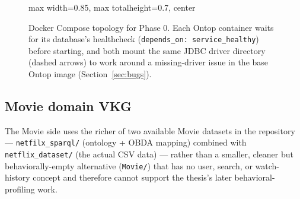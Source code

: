 \documentclass[11pt,a4paper]{article}
\newcommand{\code}[1]{\texttt{#1}}
\begin{document}
\begin{figure}[H]
\centering
\begin{adjustbox}{max width=0.85\textwidth, max totalheight=0.7\textheight, center}
\end{adjustbox}
\caption{Docker Compose topology for Phase 0. Each Ontop container waits for its database's
healthcheck (\code{depends\_on: service\_healthy}) before starting, and both mount the same JDBC
driver directory (dashed arrows) to work around a missing-driver issue in the base Ontop image
(Section~\ref{sec:bugs}).}
\label{fig:phase0}
\end{figure}

\subsection{Movie domain VKG}

The Movie side uses the richer of two available Movie datasets in the repository ---
\code{netfilx\_sparql/} (ontology + OBDA mapping) combined with \code{netflix\_dataset/} (the
actual CSV data) --- rather than a smaller, cleaner but behaviorally-empty alternative
(\code{Movie/}) that has no user, search, or watch-history concept and therefore cannot support
the thesis's later behavioral-profiling work.
\end{document}
